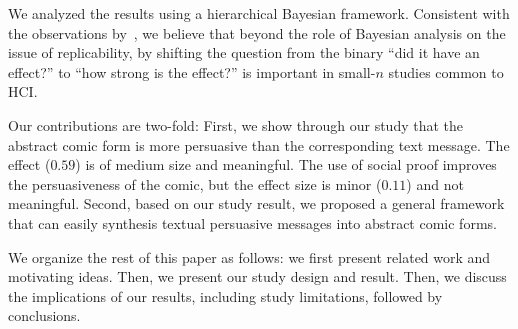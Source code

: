We analyzed the results using a hierarchical Bayesian framework. Consistent with the observations by~\textcite{Kay2016}, we believe that beyond the role of Bayesian analysis on the issue of replicability, by shifting the question from the binary ``did it have an effect?'' to ``how strong is the effect?'' is important in small-$n$ studies common to HCI.

Our contributions are two-fold: First, we show through our study that the abstract comic form is more persuasive than the corresponding text message. The effect ($0.59$) is of medium size and meaningful. The use of social proof improves the persuasiveness of the comic, but the effect size is minor ($0.11$) and not meaningful. Second, based on our study result, we proposed a general framework that can easily synthesis textual persuasive messages into abstract comic forms. 

We organize the rest of this paper as follows: we first present related work and motivating ideas. Then, we present our study design and result. Then, we discuss the implications of our results, including study limitations, followed by conclusions.







